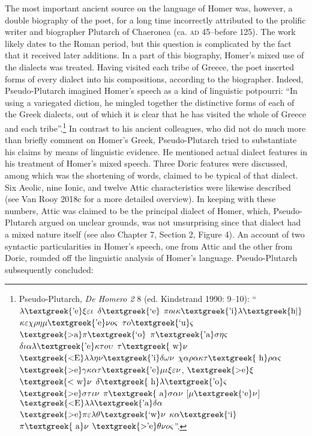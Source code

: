 \begin{styleStandard}
The most important ancient source on the language of Homer was, however, a double biography of the poet, for a long time incorrectly attributed to the prolific writer and biographer Plutarch of Chaeronea (ca. \textsc{ad} 45–before 125). The work likely dates to the Roman period, but this question is complicated by the fact that it received later additions. In a part of this biography, Homer’s mixed use of the dialects was treated. Having visited each tribe of Greece, the poet inserted forms of every dialect into his compositions, according to the biographer. Indeed, Pseudo-Plutarch imagined Homer’s speech as a kind of linguistic potpourri: “In using a variegated diction, he mingled together the distinctive forms of each of the Greek dialects, out of which it is clear that he has visited the whole of Greece and each tribe”.\footnote{ Pseudo-Plutarch, \textit{De Homero 2} 8 (ed. Kindstrand 1990: 9–10): “$\lambda \text{\textgreek{'e}}\xi \varepsilon \iota $ $\delta \text{\textgreek{`e}}$ $\pi o\iota \kappa \text{\textgreek{'i}}\lambda \text{\textgreek{h|}}$ $\kappa \varepsilon \chi \rho \eta \mu \text{\textgreek{'e}}\nu o\varsigma $ $\tau o\text{\textgreek{`u}}\varsigma $ $\text{\textgreek{>a}}\pi \text{\textgreek{`o}}$ $\pi \text{\textgreek{'a}}\sigma \eta \varsigma $ $\delta \iota \alpha \lambda \text{\textgreek{'e}}\kappa \tau o\upsilon $ $\tau \text{\textgreek{~w}}\nu $ $\text{\textgreek{<E}}\lambda \lambda \eta \nu \text{\textgreek{'i}}\delta \omega \nu $ $\chi \alpha \rho \alpha \kappa \tau \text{\textgreek{~h}}\rho \alpha \varsigma $ $\text{\textgreek{>e}}\gamma \kappa \alpha \tau \text{\textgreek{'e}}\mu \iota \xi \varepsilon \nu $, $\text{\textgreek{>e}}\xi $ $\text{\textgreek{<~w}}\nu $ $\delta \text{\textgreek{~h}}\lambda \text{\textgreek{'o}}\varsigma $ $\text{\textgreek{>e}}\sigma \tau \iota \nu $ $\pi \text{\textgreek{~a}}\sigma \alpha \nu $ [$\mu \text{\textgreek{`e}}\nu $] $\text{\textgreek{<E}}\lambda \lambda \text{\textgreek{'a}}\delta \alpha $ $\text{\textgreek{>e}}\pi \varepsilon \lambda \theta \text{\textgreek{`w}}\nu $ $\kappa \alpha \text{\textgreek{`i}}$ $\pi \text{\textgreek{~a}}\nu $ $\text{\textgreek{>'e}}\theta \nu o\varsigma $”.} In contrast to his ancient colleagues, who did not do much more than briefly comment on Homer’s Greek, Pseudo-Plutarch tried to substantiate his claims by means of linguistic evidence. He mentioned actual dialect features in his treatment of Homer’s mixed speech. Three Doric features were discussed, among which was the shortening of words, claimed to be typical of that dialect. Six Aeolic, nine Ionic, and twelve Attic characteristics were likewise described (see Van Rooy 2018c for a more detailed overview). In keeping with these numbers, Attic was claimed to be the principal dialect of Homer, which, Pseudo-Plutarch argued on unclear grounds, was not unsurprising since that dialect had a mixed nature itself (see also Chapter 7, Section 2, Figure 4). An account of two syntactic particularities in Homer’s speech, one from Attic and the other from Doric, rounded off the linguistic analysis of Homer’s language. Pseudo-Plutarch subsequently concluded:
\end{styleStandard}

